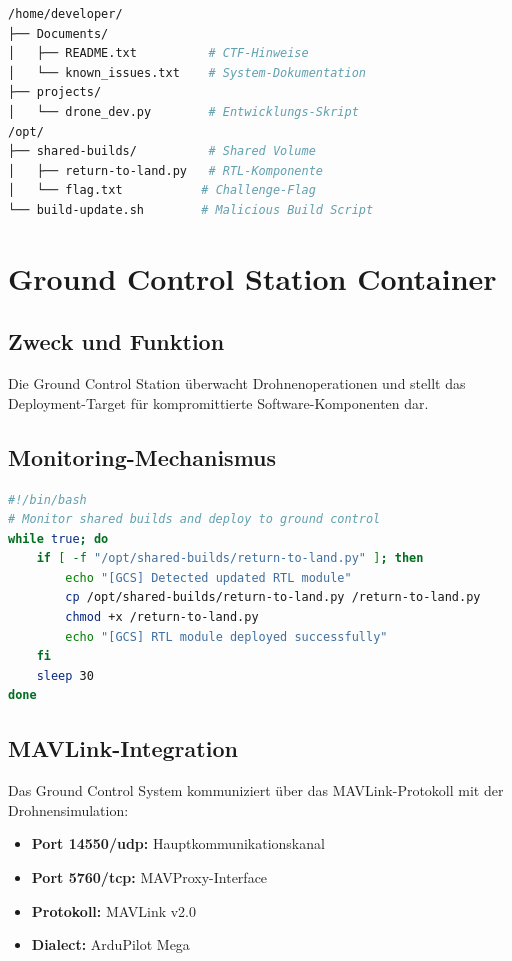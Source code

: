 \documentclass[11pt,a4paper]{article}
\begin{document}
\begin{lstlisting}[language=bash, caption=Wichtige Verzeichnisse]
/home/developer/
├── Documents/
│   ├── README.txt          # CTF-Hinweise
│   └── known_issues.txt    # System-Dokumentation
├── projects/
│   └── drone_dev.py        # Entwicklungs-Skript
/opt/
├── shared-builds/          # Shared Volume
│   ├── return-to-land.py   # RTL-Komponente
│   └── flag.txt           # Challenge-Flag
└── build-update.sh        # Malicious Build Script
\end{lstlisting}

\section{Ground Control Station Container}

\subsection{Zweck und Funktion}

Die Ground Control Station überwacht Drohnenoperationen und stellt das Deployment-Target für kompromittierte Software-Komponenten dar.

\subsection{Monitoring-Mechanismus}

\begin{lstlisting}[language=bash, caption=Deploy-Monitor-Skript]
#!/bin/bash
# Monitor shared builds and deploy to ground control
while true; do
    if [ -f "/opt/shared-builds/return-to-land.py" ]; then
        echo "[GCS] Detected updated RTL module"
        cp /opt/shared-builds/return-to-land.py /return-to-land.py
        chmod +x /return-to-land.py
        echo "[GCS] RTL module deployed successfully"
    fi
    sleep 30
done
\end{lstlisting}

\subsection{MAVLink-Integration}

Das Ground Control System kommuniziert über das MAVLink-Protokoll mit der Drohnensimulation:

\begin{itemize}
    \item \textbf{Port 14550/udp:} Hauptkommunikationskanal
    \item \textbf{Port 5760/tcp:} MAVProxy-Interface
    \item \textbf{Protokoll:} MAVLink v2.0
    \item \textbf{Dialect:} ArduPilot Mega
\end{itemize}
\end{document}
